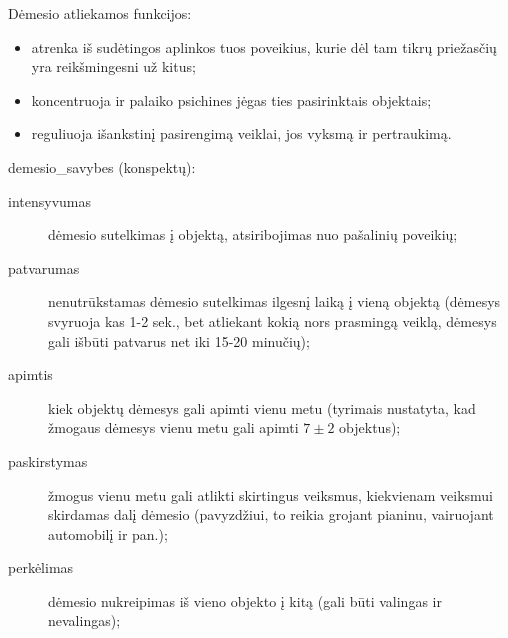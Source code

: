Dėmesio atliekamos funkcijos:

\begin{itemize}
  \item atrenka iš sudėtingos aplinkos tuos poveikius, kurie dėl tam tikrų
    priežasčių yra reikšmingesni už kitus;
  \item koncentruoja ir palaiko psichines jėgas ties pasirinktais objektais;
  \item reguliuoja išankstinį pasirengimą veiklai, jos vyksmą ir 
    pertraukimą.
\end{itemize}





\Glspl{demesio_savybe} (konspektų):

\begin{description}
  \item[intensyvumas] dėmesio sutelkimas į objektą, atsiribojimas nuo
    pašalinių poveikių;
  \item[patvarumas] nenutrūkstamas dėmesio sutelkimas ilgesnį laiką 
    į vieną objektą (dėmesys svyruoja kas 1-2 sek., bet atliekant kokią
    nors prasmingą veiklą, dėmesys gali išbūti patvarus net iki 15-20 
    minučių);
  \item[apimtis] kiek objektų dėmesys gali apimti vienu metu (tyrimais
    nustatyta, kad žmogaus dėmesys vienu metu gali apimti $7 \pm 2$ 
    objektus);
  \item[paskirstymas] žmogus vienu metu gali atlikti skirtingus veiksmus,
    kiekvienam veiksmui skirdamas dalį dėmesio (pavyzdžiui, to reikia 
    grojant pianinu, vairuojant automobilį ir pan.);
  \item[perkėlimas] dėmesio nukreipimas iš vieno objekto į kitą
    (gali būti valingas ir nevalingas);
\end{description}

